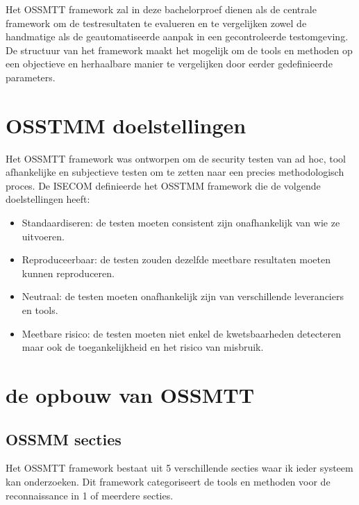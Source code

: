 Het OSSMTT framework zal in deze bachelorproef dienen als de centrale framework om de testresultaten te evalueren en te vergelijken zowel de handmatige als de geautomatiseerde aanpak in een gecontroleerde testomgeving.
De structuur van het framework maakt het mogelijk om de tools en methoden op een objectieve en herhaalbare manier te vergelijken door eerder gedefinieerde parameters.

\section{OSSTMM doelstellingen}
Het OSSMTT framework was ontworpen om de security testen van ad hoc, tool afhankelijke en subjectieve testen om te zetten naar een precies methodologisch proces.
De ISECOM definieerde het OSSTMM framework die de volgende doelstellingen heeft:

\begin{itemize}
  \item Standaardiseren: de testen moeten consistent zijn onafhankelijk van wie ze uitvoeren.
  \item Reproduceerbaar: de testen zouden dezelfde meetbare resultaten moeten kunnen reproduceren.
  \item Neutraal: de testen moeten onafhankelijk zijn van verschillende leveranciers en tools.
  \item Meetbare risico: de testen moeten niet enkel de kwetsbaarheden detecteren maar ook de toegankelijkheid en het risico van misbruik.
\end{itemize}

\section{de opbouw van OSSMTT}

\subsection{OSSMM secties}
Het OSSMTT framework bestaat uit 5 verschillende secties waar ik ieder systeem kan onderzoeken.
Dit framework categoriseert de tools en methoden voor de reconnaissance in 1 of meerdere secties.

